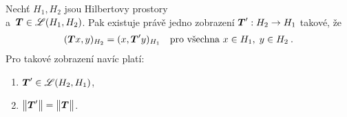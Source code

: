 \begin{theorem}
Nechť $H_1, H_2$ jsou Hilbertovy prostory\\ a~$\boldsymbol{T} \in \mathscr{L}(H_1, H_2)$. Pak existuje právě jedno zobrazení $\boldsymbol{T}' : H_2 \to H_1$ takové, že 
\begin{align} \label{eq4.dualHilbert}
    (\boldsymbol{T} x, y)_{H_2} = (x, \boldsymbol{T}'y)_{H_1} \quad \text{pro všechna } x \in H_1, \; y \in H_2 \:.
\end{align}
Pro takové zobrazení navíc platí: \begin{enumerate}
    \item $\boldsymbol{T}' \in \mathscr{L}(H_2, H_1)$,
    \item $\norm{\map T'} = \norm{\map T \vph{\map T'}}$.
\end{enumerate}
\end{theorem}

